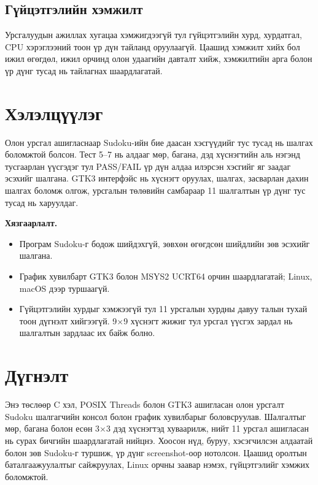 \documentclass[12pt,a4paper]{report}
\begin{document}
	\section{Гүйцэтгэлийн хэмжилт}
	Урсгалуудын ажиллах хугацаа хэмжигдээгүй тул гүйцэтгэлийн хурд, хурдатгал, CPU хэрэглээний тоон үр дүн тайланд оруулаагүй. Цаашид хэмжилт хийх бол ижил өгөгдөл, ижил орчинд олон удаагийн давталт хийж, хэмжилтийн арга болон үр дүнг тусад нь тайлагнах шаардлагатай.
	
	\chapter{Хэлэлцүүлэг}
	Олон урсгал ашигласнаар Sudoku-ийн бие даасан хэсгүүдийг тус тусад нь шалгах боломжтой болсон. Тест 5--7 нь алдааг мөр, багана, дэд хүснэгтийн аль нэгэнд тусгаарлан үүсгэдэг тул PASS/FAIL үр дүн алдаа илэрсэн хэсгийг яг заадаг эсэхийг шалгана. GTK3 интерфэйс нь хүснэгт оруулах, шалгах, засварлан дахин шалгах боломж олгож, урсгалын төлөвийн самбараар 11 шалгалтын үр дүнг тус тусад нь харуулдаг.
	
	\textbf{Хязгаарлалт.}
	\begin{itemize}
		\item Програм Sudoku-г бодож шийдэхгүй, зөвхөн өгөгдсөн шийдлийн зөв эсэхийг шалгана.
		\item График хувилбарт GTK3 болон MSYS2 UCRT64 орчин шаардлагатай; Linux, macOS дээр туршаагүй.
		\item Гүйцэтгэлийн хурдыг хэмжээгүй тул 11 урсгалын хурдны давуу талын тухай тоон дүгнэлт хийгээгүй. 9$\times$9 хүснэгт жижиг тул урсгал үүсгэх зардал нь шалгалтын зардлаас их байж болно.
	\end{itemize}
\chapter{Дүгнэлт}
Энэ төслөөр C хэл, POSIX Threads болон GTK3 ашигласан олон урсгалт Sudoku шалгагчийн консол болон график хувилбарыг боловсруулав. Шалгалтыг мөр, багана болон есөн 3$\times$3 дэд хүснэгтэд хуваарилж, нийт 11 урсгал ашигласан нь сурах бичгийн шаардлагатай нийцнэ. Хоосон нүд, буруу, хэсэгчилсэн алдаатай болон зөв Sudoku-г туршиж, үр дүнг screenshot-оор нотолсон. Цаашид оролтын баталгаажуулалтыг сайжруулах, Linux орчны заавар нэмэх, гүйцэтгэлийг хэмжих боломжтой.

\end{document}
